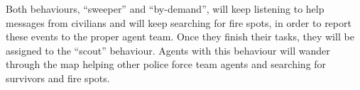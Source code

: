 Both behaviours, ``sweeper'' and ``by-demand'', will keep listening to help messages from civilians and will keep searching for fire spots, in order to report these events to the proper agent team. Once they finish their tasks, they will be assigned to the ``scout'' behaviour. Agents with this behaviour will wander through the map helping other police force team agents and searching for survivors and fire spots.

